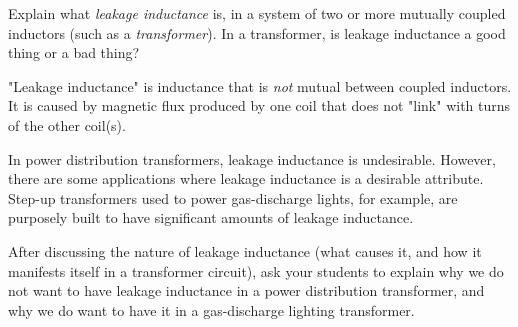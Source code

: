 

Explain what {\it leakage inductance} is, in a system of two or more mutually coupled inductors (such as a {\it transformer}).  In a transformer, is leakage inductance a good thing or a bad thing?







"Leakage inductance" is inductance that is {\it not} mutual between coupled inductors.  It is caused by magnetic flux produced by one coil that does not "link" with turns of the other coil(s).

In power distribution transformers, leakage inductance is undesirable.  However, there are some applications where leakage inductance is a desirable attribute.  Step-up transformers used to power gas-discharge lights, for example, are purposely built to have significant amounts of leakage inductance.







After discussing the nature of leakage inductance (what causes it, and how it manifests itself in a transformer circuit), ask your students to explain why we do not want to have leakage inductance in a power distribution transformer, and why we do want to have it in a gas-discharge lighting transformer.



